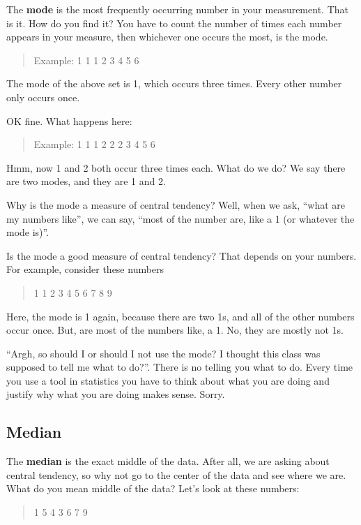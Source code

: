\documentclass[]{book}
\begin{document}
The \textbf{mode} is the most frequently occurring number in your measurement. That is it. How do you find it? You have to count the number of times each number appears in your measure, then whichever one occurs the most, is the mode.

\begin{quote}
Example: 1 1 1 2 3 4 5 6
\end{quote}

The mode of the above set is 1, which occurs three times. Every other number only occurs once.

OK fine. What happens here:

\begin{quote}
Example: 1 1 1 2 2 2 3 4 5 6
\end{quote}

Hmm, now 1 and 2 both occur three times each. What do we do? We say there are two modes, and they are 1 and 2.

Why is the mode a measure of central tendency? Well, when we ask, ``what are my numbers like'', we can say, ``most of the number are, like a 1 (or whatever the mode is)''.

Is the mode a good measure of central tendency? That depends on your numbers. For example, consider these numbers

\begin{quote}
1 1 2 3 4 5 6 7 8 9
\end{quote}

Here, the mode is 1 again, because there are two 1s, and all of the other numbers occur once. But, are most of the numbers like, a 1. No, they are mostly not 1s.

``Argh, so should I or should I not use the mode? I thought this class was supposed to tell me what to do?''. There is no telling you what to do. Every time you use a tool in statistics you have to think about what you are doing and justify why what you are doing makes sense. Sorry.

\hypertarget{median}{%
\subsection{Median}\label{median}}

The \textbf{median} is the exact middle of the data. After all, we are asking about central tendency, so why not go to the center of the data and see where we are. What do you mean middle of the data? Let's look at these numbers:

\begin{quote}
1 5 4 3 6 7 9
\end{quote}
\end{document}
